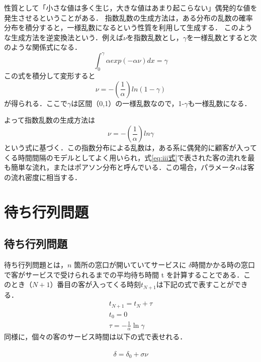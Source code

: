 \documentclass[12pt,a4j]{ltjsarticle}
\begin{document}
性質として「小さな値は多く生じ，大きな値はあまり起こらない」偶発的な値を発生させるということがある．
指数乱数の生成方法は，ある分布の乱数の確率分布を積分すると，一様乱数になるという性質を利用して生成する．
このような生成方法を逆変換法という．例えば$\nu$を指数乱数とし，$\gamma$を一様乱数とすると次のような関係式になる．
\begin{equation}
	\int_0^\gamma{\alpha}exp(-\alpha\nu)dx = \gamma \tag{i}
	\label{eq:i式}
\end{equation}
\noindent
この式を積分して変形すると
\begin{equation}
	\nu = -(\frac{1}{\alpha})ln(1-\gamma) \tag{ii}
	\label{eq:ii式}
\end{equation}
\noindent
が得られる．ここで$\gamma$は区間（0,1）の一様乱数なので，1-$\gamma$も一様乱数になる．

よって指数乱数の生成方法は
\begin{equation}
	\nu = -(\frac{1}{\alpha})ln\gamma \tag{iii}
	\label{eq:iii式}
\end{equation}
\noindent
という式に基づく．この指数分布による乱数は，ある系に偶発的に顧客が入ってくる時間間隔のモデルとしてよく用いられ，式\ref{eq:iii式}で表された客の流れを最も簡単な流れ，またはポアソン分布と呼んでいる．この場合，パラメータ$\alpha$は客の流れ密度に相当する．

\clearpage

\section{ 待ち行列問題}
\subsection{待ち行列問題}
待ち行列問題とは，$n$ 箇所の窓口が開いていてサービスに $\delta$時間かかる時の窓口で客がサービスで受けられるまでの平均待ち時間 t を計算することである．このとき（$N+1$）番目の客が入ってくる時刻$t_{N+1}$は下記の式で表すことができる．\\

\begin{eqnarray}
t_{N+1}=t_N+\tau\\
t_0=0\\　
\tau=-\frac{1}{\alpha}\ln\gamma
\end{eqnarray}
同様に，個々の客のサービス時間は以下の式で表せれる．\\　
\begin{equation}
\delta=\delta_0+\sigma\nu
\end{equation}
\end{document}
